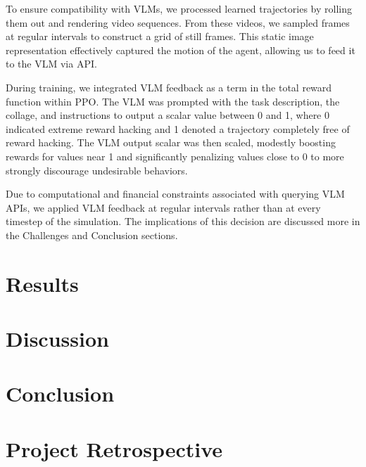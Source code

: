 \documentclass{article}
\begin{document}
To ensure compatibility with VLMs, we processed learned trajectories by rolling them out and rendering video sequences. From these videos, we sampled frames at regular intervals to construct a grid of still frames. This static image representation effectively captured the motion of the agent, allowing us to feed it to the VLM via API. 

During training, we integrated VLM feedback as a term in the total reward function within PPO. The VLM was prompted with the task description, the collage, and instructions to output a scalar value between 0 and 1, where 0 indicated extreme reward hacking and 1 denoted a trajectory completely free of reward hacking. The VLM output scalar was then scaled, modestly boosting rewards for values near 1 and significantly penalizing values close to 0 to more strongly discourage undesirable behaviors. 

Due to computational and financial constraints associated with querying VLM APIs, we applied VLM feedback at regular intervals rather than at every timestep of the simulation. The implications of this decision are discussed more in the Challenges and Conclusion sections.

\section{Results}

\section{Discussion}

\section{Conclusion}


\section{Project Retrospective}
\end{document}
